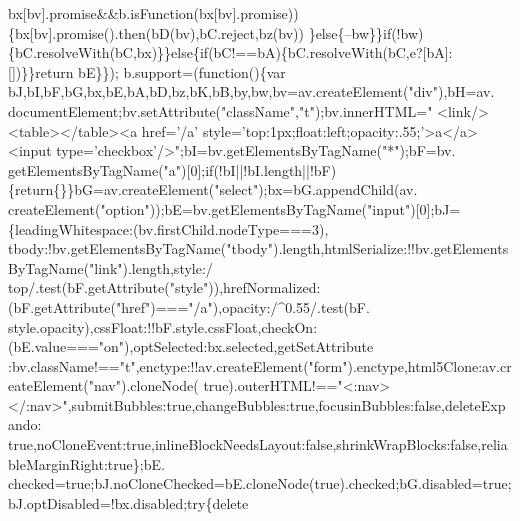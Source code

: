 \begin{DoxyCode}
      bx[bv].promise&&b.isFunction(bx[bv].promise))\{bx[bv].promise().then(bD(bv),bC.reject,bz(bv))
\}\textcolor{keywordflow}{else}\{--bw\}\}\textcolor{keywordflow}{if}(!bw)\{bC.resolveWith(bC,bx)\}\}\textcolor{keywordflow}{else}\{\textcolor{keywordflow}{if}(bC!==bA)\{bC.resolveWith(bC,e?[bA]:[])\}\}\textcolor{keywordflow}{return} bE\}\});
      b.support=(\textcolor{keyword}{function}()\{var bJ,bI,bF,bG,bx,bE,bA,bD,bz,bK,bB,by,bw,bv=av.createElement(\textcolor{stringliteral}{"div"}),bH=av.
      documentElement;bv.setAttribute(\textcolor{stringliteral}{"className"},\textcolor{stringliteral}{"t"});bv.innerHTML=\textcolor{stringliteral}{"   <link/><table></table><a href='/a'
       style='top:1px;float:left;opacity:.55;'>a</a><input type='checkbox'/>"};bI=bv.getElementsByTagName(\textcolor{stringliteral}{"*"});bF=bv.
      getElementsByTagName(\textcolor{stringliteral}{"a"})[0];\textcolor{keywordflow}{if}(!bI||!bI.length||!bF)\{\textcolor{keywordflow}{return}\{\}\}bG=av.createElement(\textcolor{stringliteral}{"select"});bx=bG.appendChild(av.
      createElement(\textcolor{stringliteral}{"option"}));bE=bv.getElementsByTagName(\textcolor{stringliteral}{"input"})[0];bJ=\{leadingWhitespace:(bv.firstChild.nodeType===3),
      tbody:!bv.getElementsByTagName(\textcolor{stringliteral}{"tbody"}).length,htmlSerialize:!!bv.getElementsByTagName(\textcolor{stringliteral}{"link"}).length,style:/
      top/.test(bF.getAttribute(\textcolor{stringliteral}{"style"})),hrefNormalized:(bF.getAttribute(\textcolor{stringliteral}{"href"})===\textcolor{stringliteral}{"/a"}),opacity:/^0.55/.test(bF.
      style.opacity),cssFloat:!!bF.style.cssFloat,checkOn:(bE.value===\textcolor{stringliteral}{"on"}),optSelected:bx.selected,getSetAttribute
      :bv.className!==\textcolor{stringliteral}{"t"},enctype:!!av.createElement(\textcolor{stringliteral}{"form"}).enctype,html5Clone:av.createElement(\textcolor{stringliteral}{"nav"}).cloneNode(\textcolor{keyword}{
      true}).outerHTML!==\textcolor{stringliteral}{"<:nav></:nav>"},submitBubbles:\textcolor{keyword}{true},changeBubbles:\textcolor{keyword}{true},focusinBubbles:\textcolor{keyword}{false},deleteExpando:\textcolor{keyword}{
      true},noCloneEvent:\textcolor{keyword}{true},inlineBlockNeedsLayout:\textcolor{keyword}{false},shrinkWrapBlocks:\textcolor{keyword}{false},reliableMarginRight:\textcolor{keyword}{true}\};bE.
      checked=\textcolor{keyword}{true};bJ.noCloneChecked=bE.cloneNode(\textcolor{keyword}{true}).checked;bG.disabled=\textcolor{keyword}{true};bJ.optDisabled=!bx.disabled;\textcolor{keywordflow}{try}\{\textcolor{keyword}{delete}

\end{DoxyCode}
